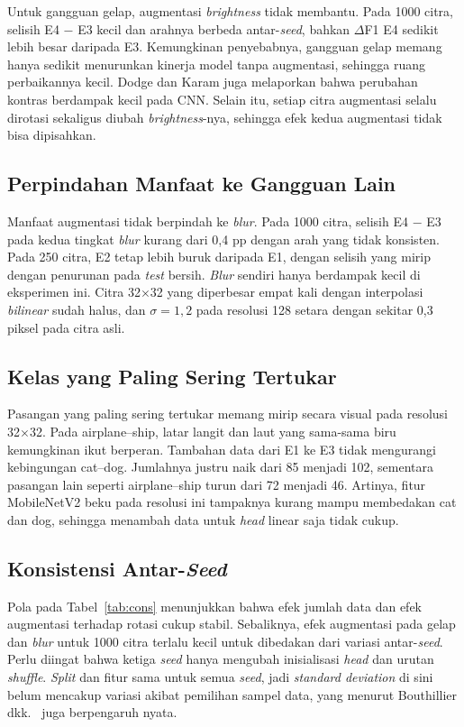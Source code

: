\documentclass[conference]{IEEEtran}
\begin{document}
Untuk gangguan gelap, augmentasi \emph{brightness} tidak membantu. Pada 1000 citra, selisih E4 $-$ E3 kecil dan arahnya berbeda antar-\emph{seed}, bahkan $\Delta$F1 E4 sedikit lebih besar daripada E3. Kemungkinan penyebabnya, gangguan gelap memang hanya sedikit menurunkan kinerja model tanpa augmentasi, sehingga ruang perbaikannya kecil. Dodge dan Karam \cite{dodge2016quality} juga melaporkan bahwa perubahan kontras berdampak kecil pada CNN. Selain itu, setiap citra augmentasi selalu dirotasi sekaligus diubah \emph{brightness}-nya, sehingga efek kedua augmentasi tidak bisa dipisahkan.

\subsection{Perpindahan Manfaat ke Gangguan Lain}

Manfaat augmentasi tidak berpindah ke \emph{blur}. Pada 1000 citra, selisih E4 $-$ E3 pada kedua tingkat \emph{blur} kurang dari 0,4 pp dengan arah yang tidak konsisten. Pada 250 citra, E2 tetap lebih buruk daripada E1, dengan selisih yang mirip dengan penurunan pada \emph{test} bersih. \emph{Blur} sendiri hanya berdampak kecil di eksperimen ini. Citra 32$\times$32 yang diperbesar empat kali dengan interpolasi \emph{bilinear} sudah halus, dan $\sigma = 1{,}2$ pada resolusi 128 setara dengan sekitar 0,3 piksel pada citra asli.

\subsection{Kelas yang Paling Sering Tertukar}

Pasangan yang paling sering tertukar memang mirip secara visual pada resolusi 32$\times$32. Pada airplane--ship, latar langit dan laut yang sama-sama biru kemungkinan ikut berperan. Tambahan data dari E1 ke E3 tidak mengurangi kebingungan cat--dog. Jumlahnya justru naik dari 85 menjadi 102, sementara pasangan lain seperti airplane--ship turun dari 72 menjadi 46. Artinya, fitur MobileNetV2 beku pada resolusi ini tampaknya kurang mampu membedakan cat dan dog, sehingga menambah data untuk \emph{head} linear saja tidak cukup.

\subsection{Konsistensi Antar-\emph{Seed}}

Pola pada Tabel~\ref{tab:cons} menunjukkan bahwa efek jumlah data dan efek augmentasi terhadap rotasi cukup stabil. Sebaliknya, efek augmentasi pada gelap dan \emph{blur} untuk 1000 citra terlalu kecil untuk dibedakan dari variasi antar-\emph{seed}. Perlu diingat bahwa ketiga \emph{seed} hanya mengubah inisialisasi \emph{head} dan urutan \emph{shuffle}. \emph{Split} dan fitur sama untuk semua \emph{seed}, jadi \emph{standard deviation} di sini belum mencakup variasi akibat pemilihan sampel data, yang menurut Bouthillier dkk.\ \cite{bouthillier2021variance} juga berpengaruh nyata.
\end{document}
